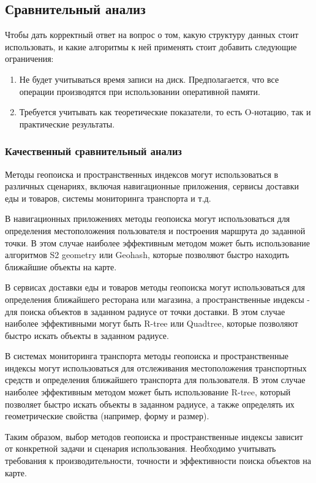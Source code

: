 \subsection{Сравнительный анализ}
Чтобы дать корректный ответ на вопрос о том, какую структуру данных стоит использовать, и какие алгоритмы к ней применять стоит добавить следующие ограничения:
\begin{enumerate}
    \item Не будет учитываться время записи на диск. Предполагается, что все операции производятся при использовании оперативной памяти.
    \item Требуется учитывать как теоретические показатели, то есть O-нотацию, так и практические результаты.
\end{enumerate}

\subsubsection{Качественный сравнительный анализ}
Методы геопоиска и пространственных индексов могут использоваться в различных сценариях, включая навигационные приложения, сервисы доставки еды и товаров, системы мониторинга транспорта и т.д.

В навигационных приложениях методы геопоиска могут использоваться для определения местоположения пользователя и построения маршрута до заданной точки. В этом случае наиболее эффективным методом может быть использование алгоритмов S2 geometry или Geohash, которые позволяют быстро находить ближайшие объекты на карте.

В сервисах доставки еды и товаров методы геопоиска могут использоваться для определения ближайшего ресторана или магазина, а пространственные индексы - для поиска объектов в заданном радиусе от точки доставки. В этом случае наиболее эффективными могут быть R-tree или Quadtree, которые позволяют быстро искать объекты в заданном радиусе.

В системах мониторинга транспорта методы геопоиска и пространственные индексы могут использоваться для отслеживания местоположения транспортных средств и определения ближайшего транспорта для пользователя. В этом случае наиболее эффективным методом может быть использование R-tree, который позволяет быстро искать объекты в заданном радиусе, а также определять их геометрические свойства (например, форму и размер).

Таким образом, выбор методов геопоиска и пространственные индексы зависит от конкретной задачи и сценария использования. Необходимо учитывать требования к производительности, точности и эффективности поиска объектов на карте.

